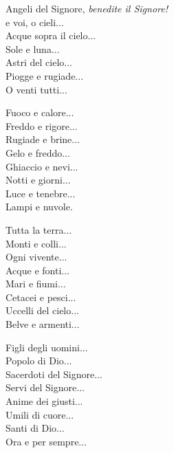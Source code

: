 

\spazio

\strofa	Angeli del Signore, \emph{benedite il Signore!}\\	
e voi, o cieli...\\
Acque sopra il cielo...\\
Sole e luna...\\
Astri del cielo...\\
Piogge e rugiade...\\
O venti tutti...

\spazio


\spazio

\strofa	Fuoco e calore...\\
Freddo e rigore...\\	
Rugiade e brine...\\
Gelo e freddo...\\
Ghiaccio e nevi...\\
Notti e giorni...\\
Luce e tenebre...\\
Lampi e nuvole.

\spazio


\spazio

\strofa	Tutta la terra...\\	
Monti e colli...\\
Ogni vivente...\\
Acque e fonti...\\
Mari e fiumi...\\
Cetacei e pesci...\\
Uccelli del cielo...\\
Belve e armenti...

\spazio


\spazio

\strofa	Figli degli uomini...\\
Popolo di Dio...\\	
Sacerdoti del Signore...\\
Servi del Signore...\\	
Anime dei giusti...\\
Umili di cuore...\\
Santi di Dio...\\
Ora e per sempre...

\spazio


